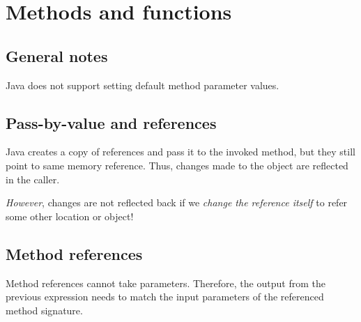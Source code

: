 \documentclass{scrartcl}
\begin{document}
\section{Methods and functions}
\subsection{General notes}

    Java does not support setting default method parameter values.

\subsection{Pass-by-value and references}

    Java creates a copy of references and pass it to the invoked method,     but they still point to same memory reference. Thus, changes made to the object are reflected in the caller.

    \textit{However}, changes are not reflected back if we \textit{change the reference itself} to refer some other location or object!


\subsection{Method references}

    Method references cannot take parameters. Therefore, the output from the previous expression needs to match the input parameters of the referenced method signature.
\end{document}
